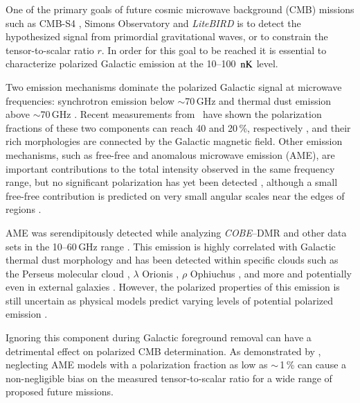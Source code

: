 \documentclass[twocolumn]{aa}
\begin{document}
One of the primary goals of future cosmic microwave background (CMB) missions such as CMB-S4 \citep{cmbs4}, Simons Observatory \citep{SO2019} and \textit{LiteBIRD} \citep{litebird2020} is to detect the hypothesized signal from primordial gravitational waves, or to constrain the tensor-to-scalar ratio $r$. In order for this goal to be reached it is essential to characterize polarized Galactic emission at the 10--100~${\rm nK}$ level.

Two emission mechanisms dominate the polarized Galactic signal at microwave frequencies: synchrotron emission below $\sim$70\,GHz and thermal dust emission above $\sim$70\,GHz \citep[e.g.,][]{page2007,planck2014-a12}. Recent measurements from \Planck\ have shown the polarization fractions of these two components can reach 40 and 20\,\%, respectively \citep{Planck2018xii}, and their rich morphologies are connected by the Galactic magnetic field. Other emission mechanisms, such as free-free and anomalous microwave emission (AME), are important contributions to the total intensity observed in the same frequency range, but no significant polarization has yet been detected \citep[e.g.,][]{planck2014-a31}, although a small free-free contribution is predicted on very small angular scales near the edges of  regions \citep{rybicki_lightman}.

AME was serendipitously detected while analyzing \emph{COBE}--DMR and other data sets in the 10--60\,GHz range \citep{kogut1996,leitch:1997,deOliveira-Costa2004}. This emission is highly correlated with Galactic thermal dust morphology and has been detected within specific clouds such as the Perseus molecular cloud \citep{bob2005,planck_low_freq_2015,vsa_ame,QUIJOTE_I}, $\lambda$ Orionis \citep{lambdaO_AME,lambdaO_cbass_quijote}, $\rho$ Ophiuchus \citep{casassus2008,arce-tord2020}, and more \citep{planck_ame2015} and potentially even in external galaxies \citep{Murphy_2010,Murphy2018,battistelli2019}. However, the polarized properties of this emission is still uncertain as physical models predict varying levels of potential polarized emission \citep{AME_state_of_play}. 

Ignoring this component during Galactic foreground removal can have a detrimental effect on polarized CMB determination. As demonstrated by \citet{Remazeilles_2016}, neglecting AME models with a polarization fraction as low as $\sim$\,1\,\% can cause a non-negligible bias on the measured tensor-to-scalar ratio for a wide range of proposed future missions.
\end{document}
